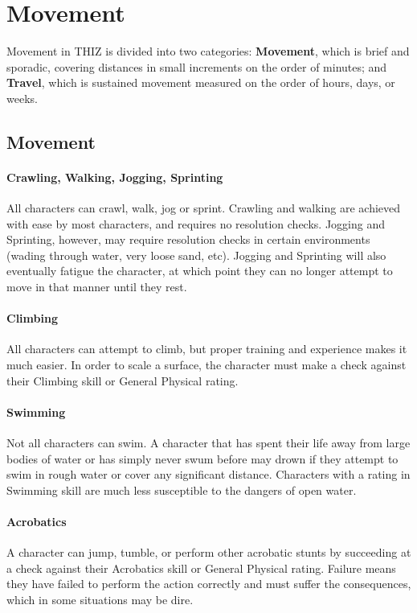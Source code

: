 \documentclass[oneside]{book}
\begin{document}
\chapter{Movement}
Movement in THIZ is divided into two categories: \textbf{Movement}, which is brief and sporadic, covering distances in small increments on the order of minutes; and \textbf{Travel}, which is sustained movement measured on the order of hours, days, or weeks. 

\begin{multicols}{2}
\section{Movement}
\subsubsection{Crawling, Walking, Jogging, Sprinting}
All characters can crawl, walk, jog or sprint. Crawling and walking are achieved with ease by most characters, and requires no resolution checks. Jogging and Sprinting, however, may require resolution checks in certain environments (wading through water, very loose sand, etc). Jogging and Sprinting will also eventually fatigue the character, at which point they can no longer attempt to move in that manner until they rest.

\subsubsection{Climbing}
All characters can attempt to climb, but proper training and experience makes it much easier. In order to scale a surface, the character must make a check against their Climbing skill or General Physical rating. 

\subsubsection{Swimming}
Not all characters can swim. A character that has spent their life away from large bodies of water or has simply never swum before may drown if they attempt to swim in rough water or cover any significant distance. Characters with a rating in Swimming skill are much less susceptible to the dangers of open water.

\subsubsection{Acrobatics}
A character can jump, tumble, or perform other acrobatic stunts by succeeding at a check against their Acrobatics skill or General Physical rating. Failure means they have failed to perform the action correctly and must suffer the consequences, which in some situations may be dire. 


\end{multicols}
\end{document}
